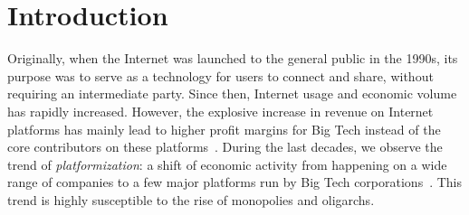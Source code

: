 \chapter{Introduction}
\label{introduction}
Originally, when the Internet was launched to the general public in the 1990s, its purpose was to serve as a technology for users to connect and share, without requiring an intermediate party. Since then, Internet usage and economic volume has rapidly increased. However, the explosive increase in revenue on Internet platforms has mainly lead to higher profit margins for Big Tech instead of the core contributors on these platforms~\citep{stiglitz2019market}. During the last decades, we observe the trend of \textit{platformization}: a shift of economic activity from happening on a wide range of companies to a few major platforms run by Big Tech corporations~\citep{prey2020locating}. This trend is highly susceptible to the rise of monopolies and oligarchs.

